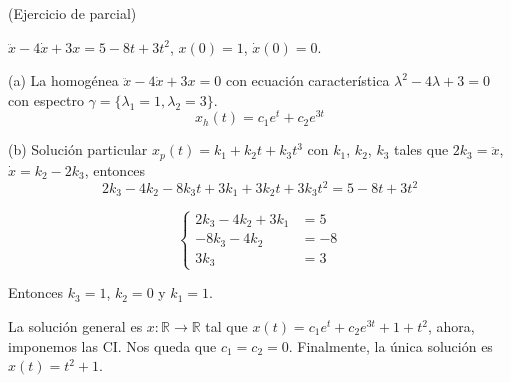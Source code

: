 \begin{exercise}

(Ejercicio de parcial)

$\ddot{x} - 4\dot{x} + 3x = 5 - 8t + 3t^2$, $x(0) = 1$, $\dot{x}(0) = 0$.

(a) La homog\'enea $\ddot{x} - 4\dot{x} + 3x = 0$ con ecuaci\'on caracter\'istica $\lambda^2 - 4\lambda + 3 = 0$ con espectro $\gamma = \lbrace \lambda_1 = 1, \lambda_2 = 3 \rbrace$.
$$
x_h(t) = c_1e^t + c_2e^{3t}
$$

(b) Soluci\'on particular $x_p(t) = k_1 + k_2t + k_3 t^3$ con $k_1$, $k_2$, $k_3$ tales que $2k_3 = \ddot{x}$, $\dot{x} = k_2 - 2k_3$, entonces
$$
2k_3 - 4k_2 - 8k_3 t + 3k_1 + 3k_2 t + 3k_3 t^2 = 5 - 8t + 3t^2
$$

\begin{equation}
\begin{cases}
	2k_3 - 4k_2 + 3k_1 &= 5 \\
	-8k_3 - 4k_2 &= -8 \\
	3k_3 &= 3
\end{cases}
\end{equation}

Entonces $k_3 = 1$, $k_2 = 0$ y $k_1 = 1$.

La soluci\'on general es $x: \mathbb{R} \rightarrow \mathbb{R}$ tal que $x(t) = c_1e^t + c_2e^{3t} + 1 + t^2$, ahora, imponemos las CI. Nos queda que $c_1 = c_2 = 0$. Finalmente, la \'unica soluci\'on es $x(t) = t^2 + 1$.
 
\end{exercise}

